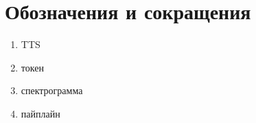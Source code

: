 \chapter{\centering Обозначения и сокращения}


\begin{enumerate}
    \item TTS
    \item токен
    \item спектрограмма
    \item пайплайн
\end{enumerate}


